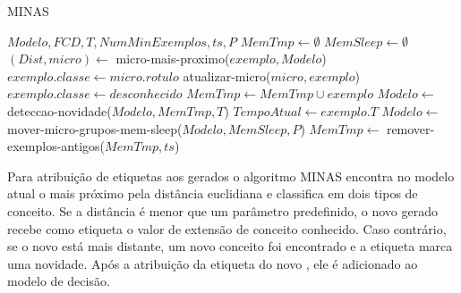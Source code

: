 \begin{algorithm}[ht]
  \caption{MINAS \cite{Faria2016minas,Cassales2019a}}
  \label{alg:MINAS}
  \renewcommand{\algorithmicrequire}{\textbf{Entrada:}}
  \begin{algorithmic}[1]
    \REQUIRE $Modelo,FCD,T,NumMinExemplos,ts,P$
    \STATE $MemTmp \leftarrow \emptyset$
    \STATE $MemSleep \leftarrow \emptyset$
    \STATE $(Dist,micro) \leftarrow$ micro-mais-proximo($exemplo,Modelo$)
    \STATE $exemplo.classe \leftarrow micro.rotulo$
    \STATE atualizar-micro($micro,exemplo$)
    \ELSE
    \STATE $exemplo.classe \leftarrow desconhecido$
    \STATE $MemTmp \leftarrow MemTmp \cup exemplo$
    \STATE $Modelo \leftarrow $ deteccao-novidade($Modelo,MemTmp,T$)
    \ENDIF
    \ENDIF
    \STATE $TempoAtual \leftarrow exemplo.T$
    \STATE $Modelo \leftarrow$ mover-micro-grupos-mem-sleep($Modelo,MemSleep,P$)
    \STATE $MemTmp \leftarrow$ remover-exemplos-antigos($MemTmp,ts$)
    \ENDIF
    \ENDFOR
  \end{algorithmic}
\end{algorithm}

Para atribuição de etiquetas aos \mclusters gerados o algoritmo MINAS
encontra no modelo atual o \mcluster mais próximo pela distância
euclidiana e classifica em dois tipos de conceito.
Se a distância é menor que um parâmetro predefinido,
o novo \mcluster gerado recebe como etiqueta o valor de extensão
de conceito conhecido.
Caso contrário, se o novo \mcluster está mais distante,
um novo conceito foi encontrado e a etiqueta marca uma novidade.
Após a atribuição da etiqueta do novo \mcluster, ele é adicionado
ao modelo de decisão.



